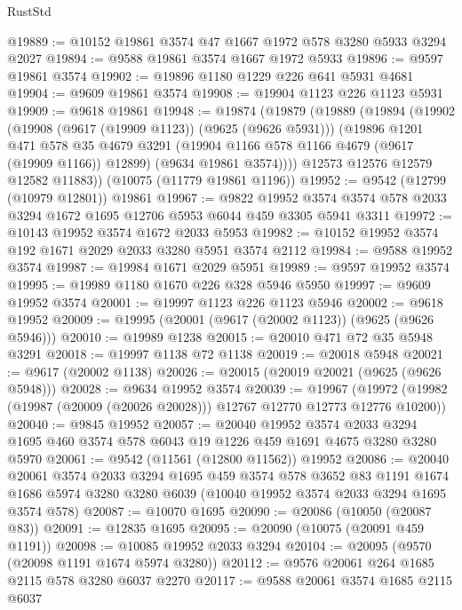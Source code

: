\begin{lexlean}{RustStd}
\begin{coremodule}
@19889 := @10152 @19861 @3574 @47 @1667 @1972 @578 @3280 @5933 @3294 @2027
@19894 := @9588 @19861 @3574 @1667 @1972 @5933
@19896 := @9597 @19861 @3574
@19902 := @19896 @1180 @1229 @226 @641 @5931 @4681
@19904 := @9609 @19861 @3574
@19908 := @19904 @1123 @226 @1123 @5931
@19909 := @9618 @19861
@19948 := @19874
    (@19879
      (@19889
        (@19894
          (@19902
            (@19908 (@9617 (@19909 @1123)) (@9625 (@9626 @5931)))
            (@19896
              @1201
              @471
              @578
              @35
              @4679
              @3291
              (@19904 @1166 @578 @1166 @4679 (@9617 (@19909 @1166)) @12899)
              (@9634 @19861 @3574))))
        @12573
        @12576
        @12579
        @12582
        @11883))
    (@10075 (@11779 @19861 @1196))
@19952 := @9542 (@12799 (@10979 @12801)) @19861
@19967 := @9822
    @19952
    @3574
    @3574
    @578
    @2033
    @3294
    @1672
    @1695
    @12706
    @5953
    @6044
    @459
    @3305
    @5941
    @3311
@19972 := @10143 @19952 @3574 @1672 @2033 @5953
@19982 := @10152 @19952 @3574 @192 @1671 @2029 @2033 @3280 @5951 @3574 @2112
@19984 := @9588 @19952 @3574
@19987 := @19984 @1671 @2029 @5951
@19989 := @9597 @19952 @3574
@19995 := @19989 @1180 @1670 @226 @328 @5946 @5950
@19997 := @9609 @19952 @3574
@20001 := @19997 @1123 @226 @1123 @5946
@20002 := @9618 @19952
@20009 := @19995 (@20001 (@9617 (@20002 @1123)) (@9625 (@9626 @5946)))
@20010 := @19989 @1238
@20015 := @20010 @471 @72 @35 @5948 @3291
@20018 := @19997 @1138 @72 @1138
@20019 := @20018 @5948
@20021 := @9617 (@20002 @1138)
@20026 := @20015 (@20019 @20021 (@9625 (@9626 @5948)))
@20028 := @9634 @19952 @3574
@20039 := @19967
    (@19972 (@19982 (@19987 (@20009 (@20026 @20028))) @12767 @12770 @12773 @12776 @10200))
@20040 := @9845 @19952
@20057 := @20040
    @19952
    @3574
    @2033
    @3294
    @1695
    @460
    @3574
    @578
    @6043
    @19
    @1226
    @459
    @1691
    @4675
    @3280
    @3280
    @5970
@20061 := @9542 (@11561 (@12800 @11562)) @19952
@20086 := @20040
    @20061
    @3574
    @2033
    @3294
    @1695
    @459
    @3574
    @578
    @3652
    @83
    @1191
    @1674
    @1686
    @5974
    @3280
    @3280
    @6039
    (@10040 @19952 @3574 @2033 @3294 @1695 @3574 @578)
@20087 := @10070 @1695
@20090 := @20086 (@10050 (@20087 @83))
@20091 := @12835 @1695
@20095 := @20090 (@10075 (@20091 @459 @1191))
@20098 := @10085 @19952 @2033 @3294
@20104 := @20095 (@9570 (@20098 @1191 @1674 @5974 @3280))
@20112 := @9576 @20061 @264 @1685 @2115 @578 @3280 @6037 @2270
@20117 := @9588 @20061 @3574 @1685 @2115 @6037

\end{coremodule}
\end{lexlean}
